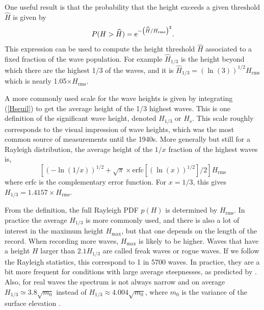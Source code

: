 
One useful result is that the probability that the height exceeds a given threshold $\widehat{H}$ 
is given by 
 \begin{equation}
P(H
>\widehat{H})=\mathrm{e}^{-\left(\widehat{H}/H_{\mathrm{rms}}\right)^2}\label{Hseuil}.
\end{equation}
This expression can be used to compute the height threshold $\widehat{H}$
associated to a fixed fraction of the wave population. For example 
$\widehat{H}_{1/3}$ is the height beyond which there are the highest 1/3 of the waves, and it is 
 $\widehat{H}_{1/3}=\left(\ln(3)\right)^{1/2}
H_{\mathrm{rms}}$ which is nearly 1.05$\times H_{\mathrm{rms}}$. 

A more commonly used scale for the wave heights is given by integrating 
 (\ref{Hseuil}) to get the average height of the 1/3 highest waves. This is one definition of 
the significant wave height, denoted $H_{1/3}$ or $H_s$. This scale roughly corresponds to the visual impression of wave heights, which was the most common source 
of measurements until the 1940s. 
More generally but still for a Rayleigh distribution, the average height of the $1/x$ fraction of the highest waves is, 
\begin{equation}
\left[\left(-\ln(1/x)\right)^{1/2} + \sqrt{\pi} \times
{\mathrm{erfc}}\left[\left(\ln(x)\right)^{1/2}\right]/2\right]
H_{\mathrm{rms}}
\end{equation}
 where erfc is the complementary error function.  For 
$x=1/3$, this gives $H_{1/3}=1.4157 \times H_{\mathrm{rms}}$.

From the definition, the full Rayleigh PDF $p(H)$ is determined by $H_{\mathrm{rms}}$. In practice the average $H_{1/3}$ is more 
commonly used, and there is also a lot of interest in the maximum height $H_{\mathrm{max}}$, but that one depends on the length of the 
record. When recording more waves,  $H_{\mathrm{max}}$ is likely to be higher. Waves that have a height
$H$ larger than $2.1 H_{1/3}$ are called freak waves or rogue waves. If we follow the Rayleigh statistics, 
this correspond to 1 in 5700 waves. In practice, they are a bit more frequent for conditions with large average steepnesses, as 
predicted by \cite{Tayfun1980}. Also, for real waves the spectrum is not always narrow and on average $H_{1/3} \simeq 3.8 \sqrt{m_0}$
instead of $H_{1/3} \approx 4.004 \sqrt{m_0}$, where $m_0$ is the variance of the surface elevation \citep{Goda1985}.

